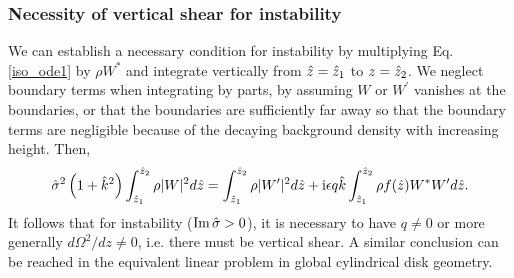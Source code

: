 \subsubsection{Necessity of vertical shear for
  instability}\label{integral_relation} 
We can establish a necessary condition for instability by multiplying
Eq. \ref{iso_ode1} by $\rho W^*$ and integrate vertically from
$\hat{z}=\hat{z}_1$ to $z=\hat{z}_2$. We neglect boundary 
terms when integrating by parts, by assuming $W$ or
$W^\prime$ vanishes at the boundaries, or that the boundaries are 
sufficiently far away so that the boundary terms are negligible because of the
decaying background density with increasing height. Then,
\begin{align}
  \hat{\sigma}^2\left(1+\hat{k}^2\right)\int_{\hat{z}_1}^{\hat{z}_2}\rho|W|^2d\hat{z}
  =\int_{\hat{z}_1}^{\hat{z}_2}\rho|W^\prime|^2d\hat{z} 
  +\mathrm{i} \epsilon q \hat{k}\int_{\hat{z}_1}^{\hat{z}_2}\rho f(\hat{z}) W^*W^\prime d\hat{z}.\label{integral_relation1}
\end{align}
It follows that for instability ($\operatorname{Im}\hat{\sigma}>0$), it is necessary to
have $q\neq0$ or more generally $d\Omega^2/dz\neq 0$, i.e. there must
be vertical shear. A similar conclusion can be reached in the
equivalent linear problem in global cylindrical disk geometry.  

